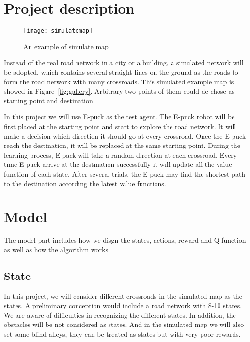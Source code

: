 \documentclass[
11pt, %
a4paper, %
oneside, %
headinclude%
BCOR3mm, %
]{scrartcl}
\begin{document}
\section{Project description}

\begin{figure}[tb]
\centering 
\texttt{[image: simulatemap]} 
\caption[An example of a floating figure]{An example of simulate map} %
\label{fig:gallery} 
\end{figure}

\quad 
Instead of the real road network in a city or a building, 
a simulated network will be adopted, which contains several straight lines on the ground as the roads to form the road network with many crossroads. 
This simulated example map is showed in Figure~\vref{fig:gallery}. %
Arbitrary two points of them could de chose as starting point and destination.

In this project we will use E-puck as the test agent. 
The E-puck robot will be first placed at the starting point and start to explore the road network. 
It will make a decision which direction it should go at every crossroad. Once the E-puck reach the destination, 
it will be replaced at the same starting point. 
During the learning process, E-pack will take a random direction at each crossroad. 
Every time E-puck arrive at the destination successfully it will update all the value function of each state. After several trials, 
the E-puck may find the shortest path to the destination according the latest value functions.




\section{Model}

\quad The model part includes how we disgn the states, actions, reward and Q function as well as how the algorithm works.


\subsection{State}
\quad
In this project, we will consider different crossroads in the simulated map as the states. 
A preliminary conception would include a road network with 8-10 states. 
We are aware of difficulties in recognizing the different states.
In addition, the obstacles will be not considered as states. 
And in the simulated map we will also set some blind alleys, they can be treated as states but with very poor rewards.
\end{document}
